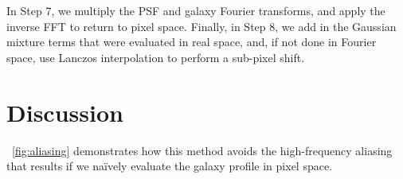 \documentclass[11pt,preprint]{aastex}
\newcommand{\figref}[1]{\figurename~\ref{#1}}
\newcommand{\Figref}[1]{\figref{#1}}
\begin{document}
In Step 7, we multiply the PSF and galaxy Fourier transforms, and
apply the inverse FFT to return to pixel space.  Finally, in Step 8,
we add in the Gaussian mixture terms that were evaluated in real
space, and, if not done in Fourier space, use Lanczos interpolation to
perform a sub-pixel shift.




% 

\section{Discussion}

\Figref{fig:aliasing} demonstrates how this method avoids the high-frequency
aliasing that results if we na\"ively evaluate the galaxy profile in
pixel space.
\end{document}
